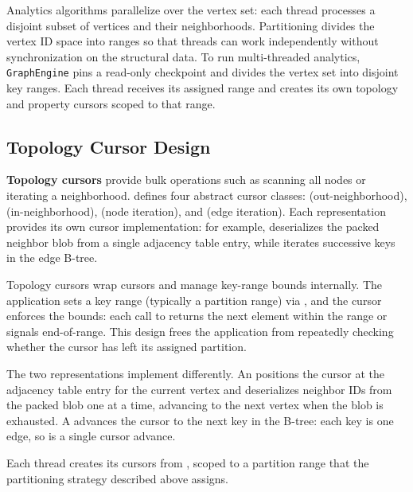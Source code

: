 Analytics algorithms parallelize over the vertex set: each thread processes a disjoint subset of vertices and their neighborhoods.
Partitioning divides the vertex ID space into ranges so that threads can work independently without synchronization on the structural data.
To run multi-threaded analytics, \texttt{GraphEngine} pins a read-only checkpoint and divides the vertex set into disjoint key ranges.
Each thread receives its assigned range and creates its own topology and property cursors scoped to that range.

\subsection{Topology Cursor Design}
\label{arch:topology-cursors}

\textbf{Topology cursors} provide bulk operations such as scanning all nodes or iterating a neighborhood.
\project{} defines four abstract cursor classes:  (out-neighborhood),  (in-neighborhood),  (node iteration), and  (edge iteration).
Each representation provides its own cursor implementation: for example,  deserializes the packed neighbor blob from a single adjacency table entry, while  iterates successive keys in the edge B-tree.

Topology cursors wrap \wt{} cursors and manage key-range bounds internally.
The application sets a key range (typically a partition range) via , and the cursor enforces the bounds: each call to  returns the next element within the range or signals end-of-range.
This design frees the application from repeatedly checking whether the cursor has left its assigned partition.

The two representations implement  differently.
An  positions the \wt{} cursor at the adjacency table entry for the current vertex and deserializes neighbor IDs from the packed blob one at a time, advancing to the next vertex when the blob is exhausted.
A  advances the \wt{} cursor to the next key in the B-tree: each key is one edge, so  is a single \wt{} cursor advance.

Each thread creates its cursors from , scoped to a partition range that the partitioning strategy described above assigns.


